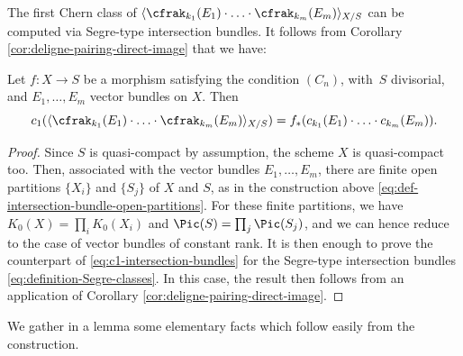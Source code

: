 The first Chern class of $\langle \cfrak_{k_{1}}(E_{1})\cdot\ldots \cdot \cfrak_{k_{m}}(E_{m})\rangle_{X/S}$ can be computed via Segre-type intersection bundles. It follows from Corollary \ref{cor:deligne-pairing-direct-image} that we have:
\begin{proposition}\label{prop:chernclassofIntbundle}
Let $f\colon X \to S$ be a morphism satisfying the condition $(C_n)$, with~$S$ divisorial, and $E_1, \ldots, E_m$ vector bundles on $X$. Then
\begin{equation}\label{eq:c1-intersection-bundles}
c_1 (\langle \cfrak_{k_{1}}(E_{1})\cdot\ldots \cdot \cfrak_{k_{m}}(E_{m})\rangle_{X/S}) = f_\ast (c_{k_{1}}(E_{1})\cdot\ldots \cdot c_{k_{m}}(E_{m}) ).
\end{equation}
\end{proposition}
\begin{proof}
Since $S$ is quasi-compact by assumption, the scheme $X$ is quasi-compact too. Then, associated with the vector bundles $E_{1},\ldots, E_{m}$, there are finite open partitions $\lbrace X_{i}\rbrace$ and $\lbrace S_{j}\rbrace$ of $X$ and $S$, as in the construction above \eqref{eq:def-intersection-bundle-open-partitions}. For these finite partitions, we have $K_{0}(X)=\prod_{i}K_{0}(X_{i})$ and $\Pic(S)=\prod_{j}\Pic(S_{j})$, and we can hence reduce to the case of vector bundles of constant rank. It is then enough to prove the counterpart of \eqref{eq:c1-intersection-bundles} for the Segre-type intersection bundles \eqref{eq:definition-Segre-classes}. In this case, the result then follows from an application of Corollary \ref{cor:deligne-pairing-direct-image}.
\end{proof}

We gather in a lemma some elementary facts which follow easily from the construction.

